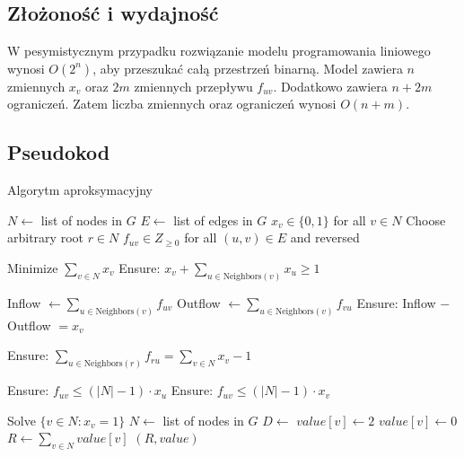 \subsection{Złożoność i wydajność}

W pesymistycznym przypadku rozwiązanie modelu programowania liniowego wynosi $O(2^n)$, aby przeszukać całą przestrzeń binarną. Model zawiera $n$ zmiennych $x_v$ oraz $2m$ zmiennych przepływu $f_{uv}$. Dodatkowo zawiera $n + 2m$ ograniczeń. Zatem liczba zmiennych oraz ograniczeń wynosi $O(n+m)$.

\subsection{Pseudokod}
\begin{algorithm}[H]
    \caption*{Algorytm aproksymacyjny}
    \begin{algorithmic}[1]
        \State $N \gets$ list of nodes in $G$
        \State $E \gets$ list of edges in $G$
        \State $x_v \in \{0,1\}$ for all $v \in N$
        \State Choose arbitrary root $r \in N$
        \State $f_{uv} \in {Z}_{\geq 0}$ for all $(u,v) \in E$ and reversed
    
        \State Minimize $\sum_{v \in N} x_v$
            \State Ensure: $x_v + \sum_{u \in \text{Neighbors}(v)} x_u \geq 1$ 
        \EndFor
    
            \State Inflow $\gets \sum_{u \in \text{Neighbors}(v)} f_{uv}$
            \State Outflow $\gets \sum_{u \in \text{Neighbors}(v)} f_{vu}$
            \State Ensure: Inflow $-$ Outflow $= x_v$ 
        \EndFor
    
        \State Ensure: $\sum_{u \in \text{Neighbors}(r)} f_{ru} = \sum_{v \in N} x_v - 1$ 
    
            \State Ensure: $f_{uv} \leq (|N|-1) \cdot x_u$
            \State Ensure: $f_{uv} \leq (|N|-1) \cdot x_v$ 
        \EndFor
    
        \State Solve
        \State \Return $\{v \in N : x_v = 1\}$
    \EndFunction
        \State $N \gets$ list of nodes in $G$
        \State $D \gets$ 
                \State $value[v] \gets 2$
            \Else
                \State $value[v] \gets 0$
            \EndIf
        \EndFor
        \State $R \gets \sum_{v \in N} value[v]$
        \State \Return $(R, value)$
    \EndFunction
    \end{algorithmic}
    \end{algorithm}

